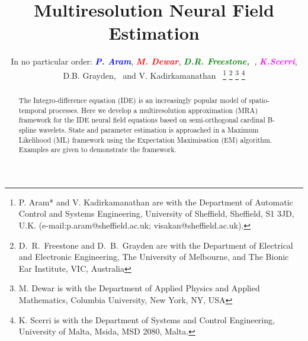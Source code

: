 \documentclass[journal,a4paper]{IEEEtran}
\newcommand{\mike}[1]{\textsf{\emph{\textbf{\textcolor{red}{#1}}}}}
\newcommand{\dean}[1]{\textsf{\emph{\textbf{\textcolor{green}{#1}}}}}
\newcommand{\parham}[1]{\textsf{\emph{\textbf{\textcolor{blue}{#1}}}}}
\newcommand{\ken}[1]{\textsf{\emph{\textbf{\textcolor{magenta}{#1}}}}}
\begin{document}
%
\title{Multiresolution Neural Field Estimation }


\author{In no particular order: \parham{P. Aram}, \mike{M. Dewar}, \dean{D.R. Freestone,~\IEEEmembership{Graduate Student Member,~IEEE,}}, \ken{K.Scerri}, D.B. Grayden,~ and V. Kadirkamanathan~ %
\thanks{P. Aram* and V. Kadirkamanathan are with the Department of Automatic Control and Systems Engineering, University of Sheffield, Sheffield, S1 3JD, U.K. (e-mail:p.aram@sheffield.ac.uk; visakan@sheffield.ac.uk).}%
\thanks{D.\ R.\ Freestone and D.\ B.\ Grayden are with the Department
of Electrical and Electronic Engineering, The University of Melbourne, and The Bionic Ear Institute, VIC, Australia}
\thanks{M. Dewar is with the Department of Applied Physics and Applied Mathematics, Columbia University, New York, NY, USA}
\thanks{K. Scerri is with the Department of Systems and Control Engineering, University
of Malta, Msida, MSD 2080, Malta.}}



% 
 \ifCLASSOPTIONpeerreview
\else
\fi


\maketitle


\begin{abstract}
The Integro-difference equation (IDE) is an increasingly popular model of spatio-temporal processes. Here we develop a multiresolution approximation (MRA) framework for the IDE neural field equations based on semi-orthogonal cardinal B-spline wavelets. State and parameter estimation is approached in a Maximum Likelihood (ML) framework using the Expectation Maximisation (EM) algorithm. Examples are given to demonstrate the framework.
\end{abstract}
\end{document}
